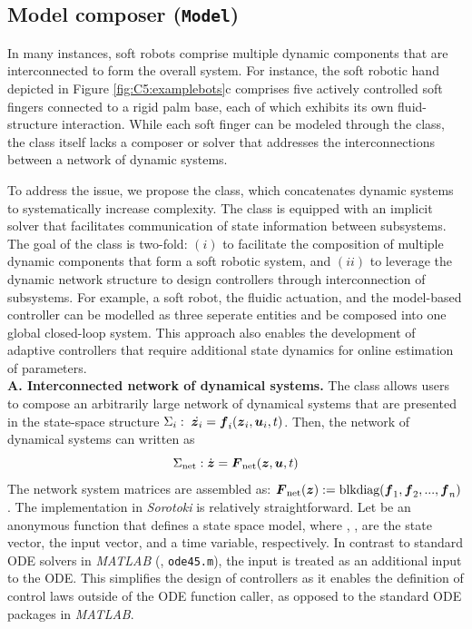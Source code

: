 
\subsection{Model composer (\texttt{Model})}
\label{sec:C5:model}
In many instances, soft robots comprise multiple dynamic components that are interconnected to form the overall system. For instance, the soft robotic hand depicted in Figure \ref{fig:C5:examplebots}c comprises five actively controlled soft fingers connected to a rigid palm base, each of which exhibits its own fluid-structure interaction. While each soft finger can be modeled through the  class, the class itself lacks a composer or solver that addresses the interconnections between a network of dynamic systems.

To address the issue, we propose the  class, which concatenates dynamic systems to systematically increase complexity. The class is equipped with an implicit solver that facilitates communication of state information between subsystems. The goal of the  class is two-fold: $(i)$ to facilitate the composition of multiple dynamic components that form a soft robotic system, and $(ii)$ to leverage the dynamic network structure to design controllers through interconnection of subsystems.
For example, a soft robot, the fluidic actuation, and the model-based controller can be modelled as three seperate entities and be composed into one global closed-loop system. This approach also enables the development of adaptive controllers that require additional state dynamics for online estimation of parameters. \\

\textbf{A. Interconnected network of dynamical systems.} The class  allows users to compose an arbitrarily large network of dynamical systems that are presented in the state-space structure $\Sigma_i:\; \dot{{\boldsymbol{z}}_i} = {\boldsymbol{f}}_{i}({\boldsymbol{z}}_i, {\boldsymbol{u}}_i, t)$. Then, the network of dynamical systems can written as
%
\begin{equation}
    \Sigma_{\textrm{net}}: \dot{{\boldsymbol{z}}} = {\boldsymbol{F}}_{\textrm{net}}({\boldsymbol{z}}, {\boldsymbol{u}}, t)
    \label{eq:C5:dynamicnetwork}
\end{equation}
%
The network system matrices are assembled as: ${\boldsymbol{F}}_{\textrm{net}}({\boldsymbol{z}}) := \textrm{blkdiag}({\boldsymbol{f}}_{1},{\boldsymbol{f}}_{2},...,{\boldsymbol{f}}_{n})$. The implementation in \textit{Sorotoki} is relatively straightforward. Let  be an anonymous function that defines a state space model, where , ,  are the state vector, the input vector, and a time variable, respectively. In contrast to standard ODE solvers in \textit{MATLAB} (\eg, \texttt{ode45.m}), the input  is treated as an additional input to the ODE. This simplifies the design of controllers as it enables the definition of control laws outside of the ODE function caller, as opposed to the standard ODE packages in \textit{MATLAB}.

